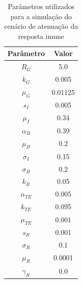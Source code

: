 \begin{table}[h]
    \centering
    \begin{tabular}{cc}
         \toprule
         Parâmetro & Valor  \\
         \midrule
            $R_G$ & 5.0 \\
            $k_G$ & 0.005 \\
            $\mu_G$ & 0.01125 \\
            $s_I$ & 0.005 \\
            $\mu_I$ & 0.34 \\
            $\alpha_B$ & 0.39 \\
            $\mu_B$ & 0.2 \\
            $\sigma_I$ & 0.15 \\
            $\sigma_B$ & 0.2 \\
            $k_B$ & 0.05 \\
            $\alpha_{TE}$ &  0.005 \\
            $k_{TE}$ & 0.095 \\
            $\mu_{TE}$ & 0.001 \\
            $s_R$ &  0.001\\
            $\sigma_{R}$ & 0.1 \\
            $\mu_R$ &  0.0001 \\
            $\gamma_R$ & 0.0 \\
         \bottomrule
    \end{tabular}
    \caption{Parâmetros utilizados para a simulação do cenário de atenuação da resposta imune}
    \label{tab_atenuacaoDiabetes}
\end{table}